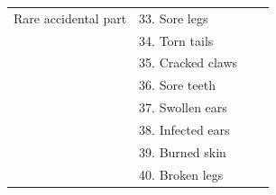 \documentclass[10pt,letterpaper]{article}
\begin{document}
\begin{table}[h]
\begin{tabular}{| l || l | l | l |}
Rare accidental part    & 33. Sore legs       &                &                     \\
                                          & 34. Torn tails                       &                &                     \\
                                          & 35. Cracked claws                         &                &                     \\
                                          & 36. Sore teeth                       &                &                     \\
                                          & 37. Swollen ears                      &                &                     \\
                                          & 38. Infected ears                    &                &                     \\
                                          & 39. Burned skin                       &                &                     \\
                                          & 40. Broken legs                     &                &                     \\                                                                                          
                                           \hline

\end{tabular}
\end{table}





\setlength{\bibleftmargin}{.125in}
\setlength{\bibindent}{-\bibleftmargin}


\end{document}
